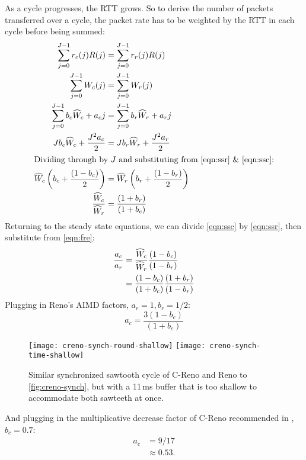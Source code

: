 As a cycle progresses, the RTT grows. So to derive the number of packets transferred over a cycle, the packet rate has to be weighted by the RTT in each cycle before being summed:
\begin{align}
	\sum_{j=0}^{J-1} r_c(j) R(j) &= \sum_{j=0}^{J-1} r_r(j) R(j)\notag\\
	\sum_{j=0}^{J-1} W_c(j) &= \sum_{j=0}^{J-1} W_r(j)\label{eqn:cwnd_equality}\\
	\sum_{j=0}^{J-1} b_c\widehat{W}_c + a_c j &= \sum_{j=0}^{J-1} b_r\widehat{W}_r + a_r j\notag\\
	Jb_c\widehat{W}_c +\frac{J^2 a_c}{2} &= Jb_r\widehat{W}_r +\frac{J^2 a_r}{2}\notag\\
\intertext{Dividing through by \(J\) and substituting from \autoref{eqn:ssr} \& \autoref{eqn:ssc}:}
    \widehat{W}_c \left(b_c + \frac{(1-b_c)}{2}\right) &= \widehat{W}_r \left(b_r + \frac{(1-b_r)}{2}\right)\notag\\
	\frac{\widehat{W}_c}{\widehat{W}_r} &= \frac{(1+b_r)}{(1+b_c)}\label{eqn:fre}
\end{align}
Returning to the steady state equations, we can divide \autoref{eqn:ssc} by \autoref{eqn:ssr}, then substitute from \autoref{eqn:fre}:
\begin{align}
	\frac{a_c}{a_r} &= 
	                 \frac{\widehat{W}_c}{\widehat{W}_r}\frac{(1-b_c)}{(1-b_r)}\notag\\
	                &= \frac{(1-b_c)}{(1+b_c)}\frac{(1+b_r)}{(1-b_r)}\label{eqn:friendly}
\end{align}
Plugging in Reno's AIMD factors, \(a_r=1, b_r=1/2\):
\begin{equation}
                \boxed{a_c = \frac{3(1-b_c)}{(1+b_c)}}\label{eqn:reno-friendly}
\end{equation}
\begin{figure*}
	\centering
	\texttt{[image: creno-synch-round-shallow]}
	\texttt{[image: creno-synch-time-shallow]}
	\caption{Similar synchronized sawtooth cycle of C-Reno and Reno to \autoref{fig:creno-synch}, but with a 11\,ms buffer that is too shallow to accommodate both sawteeth at once.}\label{fig:creno-synch-shallow}
\end{figure*}And plugging in the multiplicative decrease factor of C-Reno recommended in \cite{Rhee18:Cubic_RFC}, \(b_c=0.7\):
\begin{align*}
               a_c  &= 9/17\\
                    &\approx 0.53.
\end{align*}

